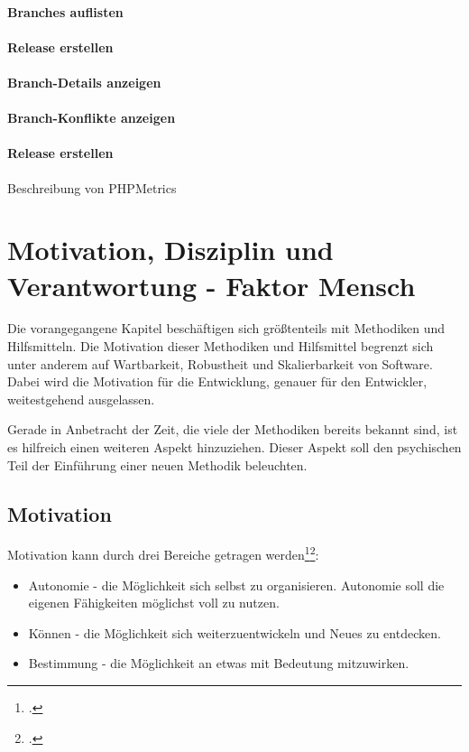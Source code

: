 \paragraph{Branches auflisten}

\paragraph{Release erstellen}

\paragraph{Branch-Details anzeigen}

\paragraph{Branch-Konflikte anzeigen}

\paragraph{Release erstellen}

Beschreibung von PHPMetrics


\section{Motivation, Disziplin und Verantwortung - Faktor Mensch}
\label{sec:human-fail}
Die vorangegangene Kapitel beschäftigen sich größtenteils mit Methodiken und Hilfsmitteln. Die Motivation dieser Methodiken und Hilfsmittel begrenzt sich unter anderem auf Wartbarkeit, Robustheit und Skalierbarkeit von Software. Dabei wird die Motivation für die Entwicklung, genauer für den Entwickler, weitestgehend ausgelassen.

Gerade in Anbetracht der Zeit, die viele der Methodiken bereits bekannt sind, ist es hilfreich einen weiteren Aspekt hinzuziehen. Dieser Aspekt soll den psychischen Teil der Einführung einer neuen Methodik beleuchten.

\subsection{Motivation}

Motivation kann durch drei Bereiche getragen werden\footcite[vgl.][]{codingame-drive}\footcite[vgl.][Kap. Autonomie ff.]{pink-drive}:
\begin{itemize}
\item Autonomie - die Möglichkeit sich selbst zu organisieren. Autonomie soll die eigenen Fähigkeiten möglichst voll zu nutzen.
\item Können - die Möglichkeit sich weiterzuentwickeln und Neues zu entdecken.
\item Bestimmung - die Möglichkeit an etwas mit Bedeutung mitzuwirken.
\end{itemize}

